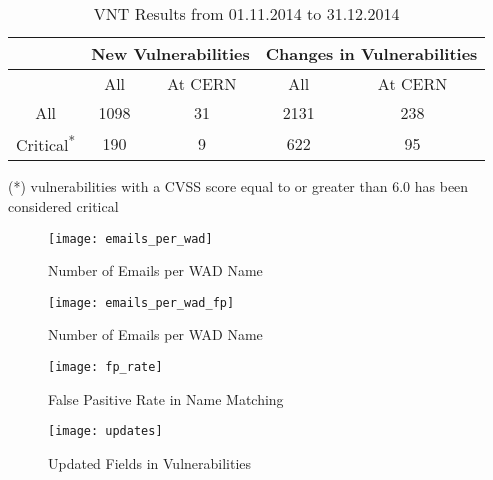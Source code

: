\begin{table}
\begin{center}
    \begin{tabular}{ | c || c | c || c | c |}
    
    \hline
	 
     &  \multicolumn{2}{c||}{New Vulnerabilities} &  \multicolumn{2}{c|}{Changes in Vulnerabilities}  
	\\ \hline   
      &  All &  At CERN &  All &  At CERN
    \\ 
	\hline    
    \hhline{|*5-}
       All & \multicolumn{1}{|c|}{\cellcolor{red!25}1098}   &  31 & \multicolumn{1}{c|}{\cellcolor{red!25}2131}  & 238 
   \\ \hhline{|*5-}
\hhline{~~|-|~|-|}
Critical\textsuperscript{*} & 190  & \multicolumn{1}{|c||}{\cellcolor{green!25}9}  & 622  & \multicolumn{1}{|c|}{\cellcolor{green!25}95  }
    \\ \hline
    \end{tabular}
    \caption{VNT Results from 01.11.2014 to 31.12.2014}
    \label{table:vnt_results}
   \end{center}
   \footnotesize{(*) vulnerabilities with a CVSS score equal to or greater than 6.0 has been considered critical}
    \end{table}




\begin{figure}[h!]
\label{figure:emails_per_wad}
  \centering
    \texttt{[image: emails\_per\_wad]}
  \caption{Number of Emails per WAD Name}
\end{figure}


\begin{figure}[h!]
\label{figure:emails_per_wad_fp}
  \centering
    \texttt{[image: emails\_per\_wad\_fp]}
  \caption{Number of Emails per WAD Name}
\end{figure}


\begin{figure}[h!]
\label{figure:fp_rate}
  \centering
    \texttt{[image: fp\_rate]}
  \caption{False Pasitive Rate in Name Matching}
\end{figure}



\begin{figure}[h!]
\label{figure:updates}
  \centering
    \texttt{[image: updates]}
  \caption{Updated Fields in Vulnerabilities}
\end{figure}



